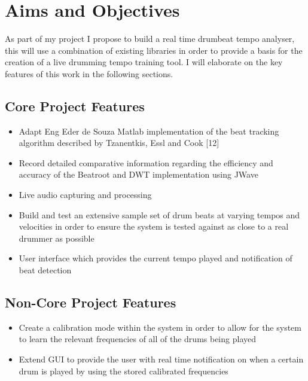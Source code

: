 \documentclass[a4paper, 11pt]{article}
\begin{document}
\maketitle{}
\section{Aims and Objectives}

As part of my project I propose to build a real time drumbeat tempo analyser, this will use a combination of existing libraries in order to provide a basis for the creation of a live drumming tempo training tool. I will elaborate on the key features of this work in the following sections.


\subsection{Core Project Features}
\begin{itemize}
\item Adapt Eng Eder de Souza Matlab implementation of the beat tracking algorithm described by Tzanentkis, Essl and Cook [12] 
\item Record detailed comparative information regarding the efficiency and accuracy of the Beatroot and DWT implementation using JWave
\item Live audio capturing and processing
\item Build and test an extensive sample set of drum beats at varying tempos and velocities in order to ensure the system is tested against as close to a real drummer as possible
\item User interface which provides the current tempo played and notification of beat detection
\end{itemize}

\subsection{Non-Core Project Features}
\begin{itemize}
\item Create a calibration mode within the system in order to allow for the system to learn the relevant frequencies of all of the drums being played
\item Extend GUI to provide the user with real time notification on when a certain drum is played by using the stored calibrated frequencies
\end{itemize}

\maketitle{} 
\end{document}
